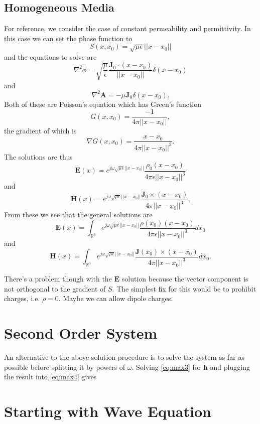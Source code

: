 \documentclass{article}
\newcommand{\norm}[1]{||#1||}
\theoremstyle{plain}
\begin{document}
\subsection{Homogeneous Media}

For reference, we consider the case of constant permeability and permittivity. In this case we can set the phase function to
\begin{equation}
	S(x,x_0) = \sqrt{\mu\epsilon}\norm{x-x_0}
\end{equation}
and the equations to solve are
\begin{equation}
	\nabla^2\phi = \sqrt{\frac{\mu}{\epsilon}}\frac{\mathbf{J}_0\cdot(x-x_0)}{\norm{x-x_0}}\delta(x-x_0)
\end{equation}
and
\begin{equation}
	\nabla^2\mathbf{A} = -\mu\mathbf{J}_0\delta(x-x_0).
\end{equation}
Both of these are Poisson's equation which has Green's function
\begin{equation}
	G(x,x_0) = \frac{-1}{4\pi\norm{x-x_0}},
\end{equation}
the gradient of which is
\begin{equation}
	\nabla G(x,x_0) = \frac{x-x_0}{4\pi\norm{x-x_0}^3}.
\end{equation}
The solutions are thus
\begin{equation}
	\mathbf{E}(x) = e^{j\omega\sqrt{\mu\epsilon}\norm{x-x_0}}\frac{\rho_0(x-x_0)}{4\pi\epsilon\norm{x-x_0}^3}
\end{equation}
and
\begin{equation}
	\mathbf{H}(x) = e^{j\omega\sqrt{\mu\epsilon}\norm{x-x_0}}\frac{\mathbf{J}_0\times(x-x_0)}{4\pi\norm{x-x_0}^3}.
\end{equation}
From these we see that the general solutions are
\begin{equation}
	\mathbf{E}(x) = \int_{\mathbb{R}^3} e^{j\omega\sqrt{\mu\epsilon}\norm{x-x_0}}\frac{\rho(x_0)(x-x_0)}{4\pi\epsilon\norm{x-x_0}^3} dx_0
\end{equation}
and
\begin{equation}
	\mathbf{H}(x) = \int_{\mathbb{R}^3} e^{j\omega\sqrt{\mu\epsilon}\norm{x-x_0}}\frac{\mathbf{J}(x_0)\times(x-x_0)}{4\pi\norm{x-x_0}^3} dx_0.
\end{equation}

There's a problem though with the $\mathbf{E}$ solution because the vector component is not orthogonal to the gradient of $S$. The simplest fix for this would be to prohibit charges, i.e. $\rho=0$. Maybe we can allow dipole charges.



\section{Second Order System}

An alternative to the above solution procedure is to solve the system as far as possible before splitting it by powers of $\omega$. Solving \eqref{eq:max3} for $\mathbf{h}$ and plugging the result into \eqref{eq:max4} gives



\section{Starting with Wave Equation}
\end{document}
